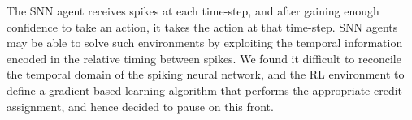 \documentclass[fyp]{socreport}
\begin{document}
The SNN agent receives spikes at each time-step, and after gaining enough
confidence to take an action, it takes the action at that time-step. SNN agents
may be able to solve such environments by exploiting the temporal information
encoded in the relative timing between spikes. We found it difficult to
reconcile the temporal domain of the spiking neural network, and the RL
environment to define a gradient-based learning algorithm that performs the
appropriate credit-assignment, and hence decided to pause on this front.
\end{document}
